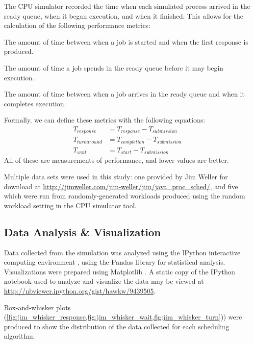 \documentclass[12pt,letterpaper]{article}
\begin{document}
			The CPU simulator recorded the time when each simulated process arrived in the ready queue, when it began execution, and when it finished. This allows for the calculation of the following performance metrics:
				\begin{description}[leftmargin=4.5cm, style=sameline]
					\item[Response Time]{The amount of time between when a job is started and when the first response is produced.}
					\item[Wait Time]{The amount of time a job spends in the ready queue before it may begin execution.}
					\item[Turnaround Time]{The amount of time between when a job arrives in the ready queue and when it completes execution.}
				\end{description}

			Formally, we can define these metrics with the following equations:
				\begin{align*}
				  	T_{response} &= T_{response} - T_{submission}\\
					T_{turnaround} &= T_{completion} - T_{submission}\\
					T_{wait} &= T_{start} - T_{submission}
				\end{align*}
			All of these are measurements of performance, and lower values are better.

			Multiple data sets were used in this study: one provided by Jim Weller for download at \url{http://jimweller.com/jim-weller/jim/java_proc_sched/}, and five which were run from randomly-generated workloads produced using the random workload setting in the CPU simulator tool.

		\subsection{Data Analysis \& Visualization}
			Data collected from the simulation was analyzed using the IPython interactive computing environment \cite{ipython}, using the Pandas library \cite{ pandas} for statistical analysis. Visualizations were prepared using Matplotlib \cite{matplotlib}. A static copy of the IPython notebook used to analyze and visualize the data may be viewed at \url{http://nbviewer.ipython.org/gist/hawkw/9439505}.

			Box-and-whisker plots (\cref{fig:jim_whisker_response,fig:jim_whisker_wait,fig:jim_whisker_turn})) were produced to show the distribution of the data collected for each scheduling algorithm.
\end{document}
